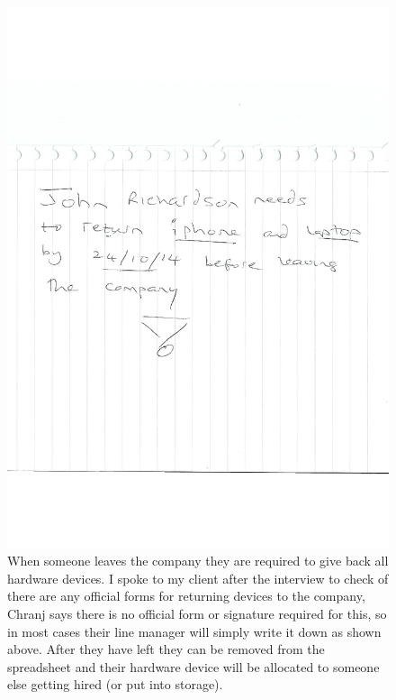 \begin{figure}[H]
\includegraphics[width=.9\textwidth,height=.9\textheight,keepaspectratio]{LeaveOfWork.jpg}
\caption{When someone leaves the company they are required to give back all hardware devices. I spoke to my client after the interview to check of there are any official forms for returning devices to the company, Chranj says there is no official form or signature required for this, so in most cases their line manager will simply write it down as shown above. After they have left they can be removed from the spreadsheet and their hardware device will be allocated to someone else getting hired (or put into storage).} \label{LeaveOfWork}
\end{figure}

